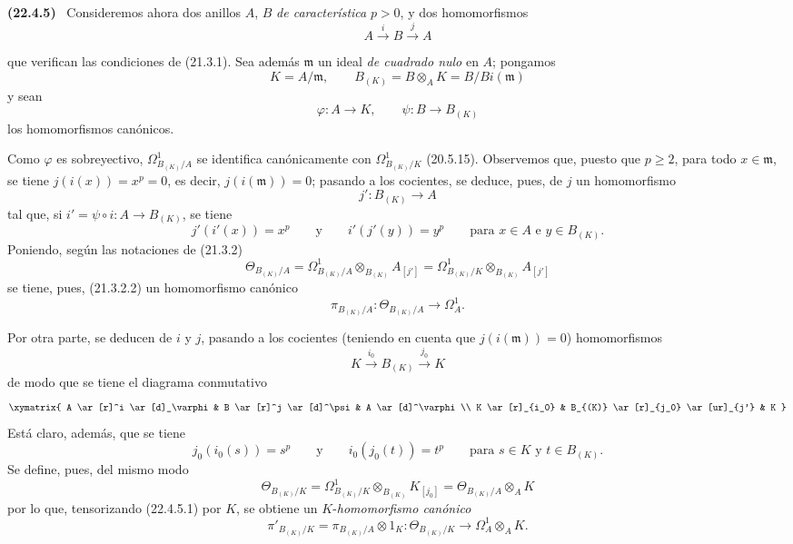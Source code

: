 \documentclass[10pt,oneside]{book}
\makeatletter
\newcommand{\setmanualcurrentlabel}[1]{\def\@currentlabel{#1}}
\newcommand{\oldpage}[2][]{%
  \setcounter{footnote}{0}%
  \marginpar{\scriptsize\textbf{#1}~|~#2}\ignorespaces}
\newenvironment{env}[1][]{\setmanualcurrentlabel{#1}\par\medskip\noindent\textbf{(#1)}\ }{\par}
\makeatother
\begin{document}
\begin{env}[22.4.5]
\label{0.22.4.5-es}
Consideremos ahora dos anillos $A$, $B$ \emph{de característica} $p>0$, y
dos homomorfismos
\[
  A\xrightarrow{i}B\xrightarrow{j}A
\]

\oldpage[0\textsubscript{IV-1}]{197}

que verifican las condiciones de (21.3.1). Sea además $\mathfrak m$ un ideal
\emph{de cuadrado nulo} en $A$; pongamos
\[
  K=A/\mathfrak m,\qquad
  B_{(K)}=B\otimes_AK=B/Bi(\mathfrak m)
\]
y sean
\[
  \varphi:A\longrightarrow K,\qquad
  \psi:B\longrightarrow B_{(K)}
\]
los homomorfismos canónicos.

Como $\varphi$ es sobreyectivo, $\Omega^1_{B_{(K)}/A}$ se identifica
canónicamente con $\Omega^1_{B_{(K)}/K}$ (20.5.15). Observemos que, puesto que
$p\geqslant2$, para todo $x\in\mathfrak m$, se tiene $j(i(x))=x^p=0$, es decir,
$j(i(\mathfrak m))=0$; pasando a los cocientes, se deduce, pues, de $j$ un
homomorfismo
\[
  j':B_{(K)}\longrightarrow A
\]
tal que, si $i'=\psi\circ i:A\longrightarrow B_{(K)}$, se tiene
\[
  j'(i'(x))=x^p\qquad\text{y}\qquad i'(j'(y))=y^p
  \qquad\text{para }x\in A\text{ e }y\in B_{(K)}.
\]
Poniendo, según las notaciones de (21.3.2)
\[
  \Theta_{B_{(K)}/A}
  =\Omega^1_{B_{(K)}/A}\otimes_{B_{(K)}}A_{[j']}
  =\Omega^1_{B_{(K)}/K}\otimes_{B_{(K)}}A_{[j']}
\]
se tiene, pues, (21.3.2.2) un homomorfismo canónico
\begin{equation}
\label{0.22.4.5.1-es}
  \pi_{B_{(K)}/A}:\Theta_{B_{(K)}/A}\longrightarrow\Omega^1_A.
  \tag{22.4.5.1}
\end{equation}

Por otra parte, se deducen de $i$ y $j$, pasando a los cocientes (teniendo en
cuenta que $j(i(\mathfrak m))=0$) homomorfismos
\[
  K\xrightarrow{i_0}B_{(K)}\xrightarrow{j_0}K
\]
de modo que se tiene el diagrama conmutativo
\[
  \xymatrix{
    A \ar[r]^i \ar[d]_\varphi & B \ar[r]^j \ar[d]^\psi & A \ar[d]^\varphi \\
    K \ar[r]_{i_0} & B_{(K)} \ar[r]_{j_0} \ar[ur]_{j'} & K
  }
\]
Está claro, además, que se tiene
\[
  j_0(i_0(s))=s^p\qquad\text{y}\qquad i_0(j_0(t))=t^p
  \qquad\text{para }s\in K\text{ y }t\in B_{(K)}.
\]
Se define, pues, del mismo modo
\[
  \Theta_{B_{(K)}/K}
  =\Omega^1_{B_{(K)}/K}\otimes_{B_{(K)}}K_{[j_0]}
  =\Theta_{B_{(K)}/A}\otimes_AK
\]
por lo que, tensorizando (22.4.5.1) por $K$, se obtiene un
$K$-\emph{homomorfismo canónico}
\begin{equation}
\label{0.22.4.5.2-es}
  \pi'_{B_{(K)}/K}=\pi_{B_{(K)}/A}\otimes1_K:
  \Theta_{B_{(K)}/K}\longrightarrow\Omega^1_A\otimes_AK.
  \tag{22.4.5.2}
\end{equation}


\end{env}
\end{document}
